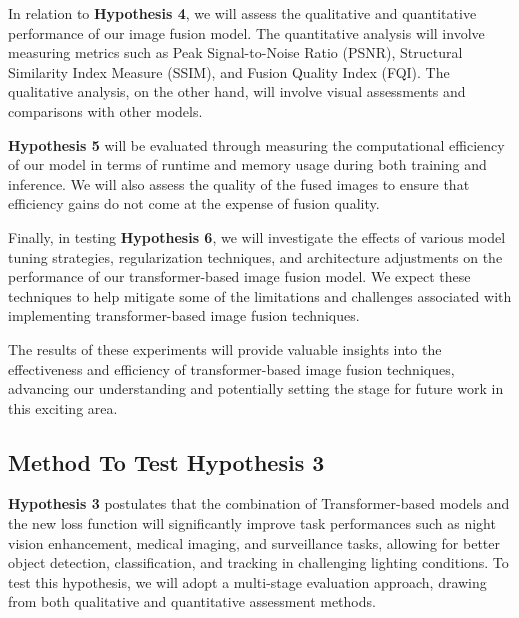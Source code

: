 In relation to \textbf{Hypothesis 4}, we will assess the qualitative and quantitative performance of our image fusion model. The quantitative analysis will involve measuring metrics such as Peak Signal-to-Noise Ratio (PSNR), Structural Similarity Index Measure (SSIM), and Fusion Quality Index (FQI). The qualitative analysis, on the other hand, will involve visual assessments and comparisons with other models.

\textbf{Hypothesis 5} will be evaluated through measuring the computational efficiency of our model in terms of runtime and memory usage during both training and inference. We will also assess the quality of the fused images to ensure that efficiency gains do not come at the expense of fusion quality.

Finally, in testing \textbf{Hypothesis 6}, we will investigate the effects of various model tuning strategies, regularization techniques, and architecture adjustments on the performance of our transformer-based image fusion model. We expect these techniques to help mitigate some of the limitations and challenges associated with implementing transformer-based image fusion techniques.

The results of these experiments will provide valuable insights into the effectiveness and efficiency of transformer-based image fusion techniques, advancing our understanding and potentially setting the stage for future work in this exciting area.

\subsection{Method To Test Hypothesis 3} \label{subsec:met4}

\textbf{Hypothesis 3} postulates that the combination of Transformer-based models and the new loss function will significantly improve task performances such as night vision enhancement, medical imaging, and surveillance tasks, allowing for better object detection, classification, and tracking in challenging lighting conditions. To test this hypothesis, we will adopt a multi-stage evaluation approach, drawing from both qualitative and quantitative assessment methods.

